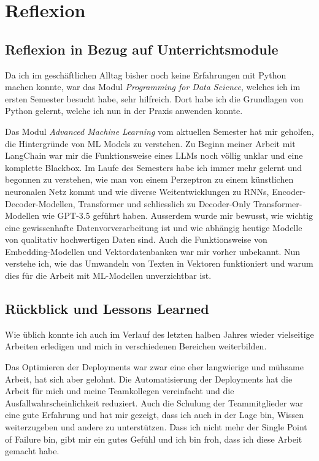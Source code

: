 \documentclass{bpraxis}
\begin{document}
\section{Reflexion}

\subsection{Reflexion in Bezug auf Unterrichtsmodule}

Da ich im geschäftlichen Alltag bisher noch keine Erfahrungen mit Python machen konnte, war das Modul \textit{Programming for Data Science}, welches ich im ersten Semester besucht habe, sehr hilfreich.
Dort habe ich die Grundlagen von Python gelernt, welche ich nun in der Praxis anwenden konnte.

Das Modul \textit{Advanced Machine Learning} vom aktuellen Semester hat mir geholfen, die Hintergründe von ML Models zu verstehen. Zu Beginn meiner Arbeit mit LangChain war mir die Funktionsweise eines LLMs
noch völlig unklar und eine komplette Blackbox. Im Laufe des Semesters habe ich immer mehr gelernt und begonnen zu verstehen, wie man von einem Perzeptron zu einem künstlichen neuronalen Netz kommt und wie
diverse Weitentwicklungen zu RNNs, Encoder-Decoder-Modellen, Transformer und schliesslich zu Decoder-Only Transformer-Modellen wie GPT-3.5 geführt haben.
Ausserdem wurde mir bewusst, wie wichtig eine gewissenhafte Datenvorverarbeitung ist und wie abhängig heutige Modelle von qualitativ hochwertigen Daten sind.
Auch die Funktionsweise von Embedding-Modellen und Vektordatenbanken war mir vorher unbekannt. Nun verstehe ich, wie das Umwandeln von Texten in Vektoren funktioniert und warum dies für die Arbeit mit ML-Modellen
unverzichtbar ist.

\subsection{Rückblick und Lessons Learned}

Wie üblich konnte ich auch im Verlauf des letzten halben Jahres wieder vielseitige Arbeiten erledigen und mich in verschiedenen Bereichen weiterbilden.

Das Optimieren der Deployments war zwar eine eher langwierige und mühsame Arbeit, hat sich aber gelohnt. Die Automatisierung der Deployments hat die Arbeit für mich und meine Teamkollegen vereinfacht und
die Ausfallwahrscheinlichkeit reduziert. Auch die Schulung der Teammitglieder war eine gute Erfahrung und hat mir gezeigt, dass ich auch in der Lage bin, Wissen weiterzugeben und andere zu unterstützen. Dass
ich nicht mehr der Single Point of Failure bin, gibt mir ein gutes Gefühl und ich bin froh, dass ich diese Arbeit gemacht habe.
\end{document}
